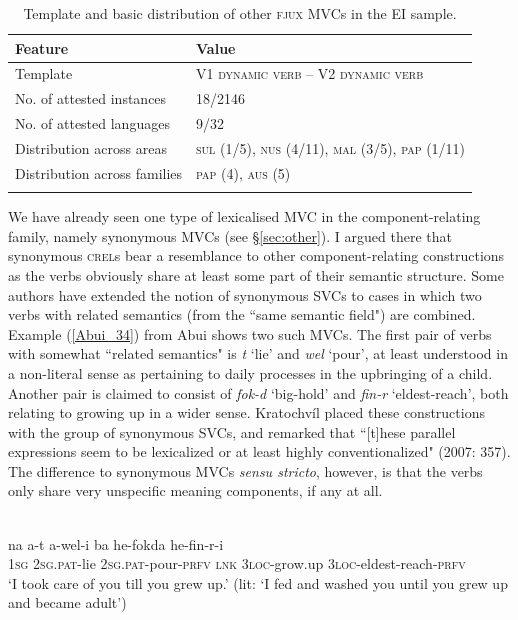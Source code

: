 \begin{table}
\begin{tabular}{ll}
\lsptoprule
Feature&Value\tabularnewline
\midrule
Template& V1 \textsc{dynamic verb} -- V2 \textsc{dynamic verb}\tabularnewline
No. of attested instances& 18/2146 \tabularnewline
No. of attested languages& 9/32 \tabularnewline
Distribution across areas& \textsc{sul} (1/5), \textsc{nus} (4/11), \textsc{mal} (3/5), \textsc{pap} (1/11) \tabularnewline
Distribution across families& \textsc{pap} (4), \textsc{aus} (5) \tabularnewline
\lspbottomrule
\end{tabular}
\caption[Template and basic distribution of other \textsc{fjux} MVCs]{Template and basic distribution of other \textsc{fjux} MVCs in the EI sample.}
\label{table:other_fjux}
\end{table}

We have already seen one type of lexicalised MVC in the component-relating family, namely synonymous MVCs (see §\ref{sec:other}). I argued there that synonymous \textsc{crel}s bear a resemblance to other component-relating constructions as the verbs obviously share at least some part of their semantic structure. Some authors have extended the notion of synonymous SVCs to cases in which two verbs with related semantics (from the ``same semantic field") are combined. Example (\ref{Abui_34}) from Abui shows two such MVCs. The first pair of verbs with somewhat ``related semantics" is \textit{t} `lie' and \textit{wel} `pour', at least understood in a non-literal sense as pertaining to daily processes in the upbringing of a child. Another pair is claimed to consist of \textit{fok-d} `big-hold' and \textit{fin-r} `eldest-reach', both relating to growing up in a wider sense. Kratochvíl placed these constructions with the group of synonymous SVCs, and remarked that ``[t]hese parallel expressions seem to be lexicalized or at least highly conventionalized" (2007: 357). The difference to synonymous MVCs \textit{sensu stricto}, however, is that the verbs only share very unspecific meaning components, if any at all.

\ea \label{Abui_34}
\\
\gll na a-t a-wel-i ba he-fokda he-fin-r-i \\
1\textsc{sg} 2\textsc{sg}.\textsc{pat}-lie 2\textsc{sg}.\textsc{pat}-pour-\textsc{prfv} \textsc{lnk} 3\textsc{loc}-grow.up 3\textsc{loc}-eldest-reach-\textsc{prfv} \\
\glft ‘I took care of you till you grew up.’ (lit: ‘I fed and washed you until you grew up and
became adult’)\\
\z

